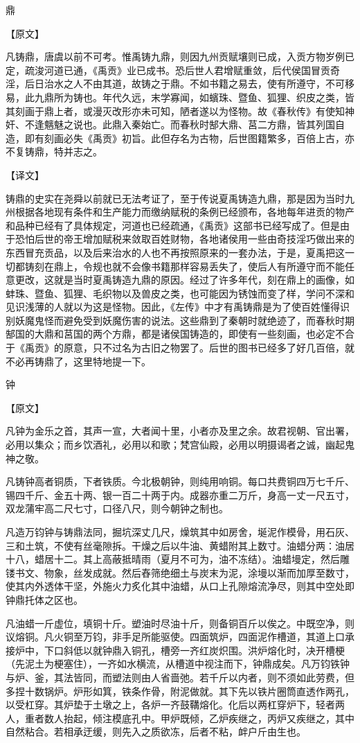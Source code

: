 \documentclass[12pt,UTF8]{ctexbook}
\begin{document}
鼎

【原文】

凡铸鼎，唐虞以前不可考。惟禹铸九鼎，则因九州贡赋壤则已成，入贡方物岁例已定，疏浚河道已通，《禹贡》业已成书。恐后世人君增赋重敛，后代侯国冒贡奇淫，后日治水之人不由其道，故铸之于鼎。不如书籍之易去，使有所遵守，不可移易，此九鼎所为铸也。年代久远，末学寡闻，如蠙珠、暨鱼、狐狸、织皮之类，皆其刻画于鼎上者，或漫灭改形亦未可知，陋者遂以为怪物。故《春秋传》有使知神奸、不逢魑魅之说也。此鼎入秦始亡。而春秋时郜大鼎、莒二方鼎，皆其列国自造，即有刻画必失《禹贡》初旨。此但存名为古物，后世图籍繁多，百倍上古，亦不复铸鼎，特并志之。

【译文】

铸鼎的史实在尧舜以前就已无法考证了，至于传说夏禹铸造九鼎，那是因为当时九州根据各地现有条件和生产能力而缴纳赋税的条例已经颁布，各地每年进贡的物产和品种已经有了具体规定，河道也已经疏通，《禹贡》这部书已经写成了。但是由于恐怕后世的帝王增加赋税来敛取百姓财物，各地诸侯用一些由奇技淫巧做出来的东西冒充贡品，以及后来治水的人也不再按照原来的一套办法，于是，夏禹把这一切都铸刻在鼎上，令规也就不会像书籍那样容易丢失了，使后人有所遵守而不能任意更改，这就是当时夏禹铸造九鼎的原因。经过了许多年代，刻在鼎上的画像，如蚌珠、暨鱼、狐狸、毛织物以及兽皮之类，也可能因为锈蚀而变了样，学问不深和见识浅薄的人就以为这是怪物。因此，《左传》中才有禹铸鼎是为了使百姓懂得识别妖魔鬼怪而避免受到妖魔伤害的说法。这些鼎到了秦朝时就绝迹了，而春秋时期郜国的大鼎和莒国的两个方鼎，都是诸侯国铸造的，即使有一些刻画，也必定不合于《禹贡》的原意，只不过名为古旧之物罢了。后世的图书已经多了好几百倍，就不必再铸鼎了，这里特地提一下。

钟

【原文】

凡钟为金乐之首，其声一宣，大者闻十里，小者亦及里之余。故君视朝、官出署，必用以集众；而乡饮酒礼，必用以和歌；梵宫仙殿，必用以明摄谒者之诚，幽起鬼神之敬。

凡铸钟高者铜质，下者铁质。今北极朝钟，则纯用响铜。每口共费铜四万七千斤、锡四千斤、金五十两、银一百二十两于内。成器亦重二万斤，身高一丈一尺五寸，双龙蒲牢高二尺七寸，口径八尺，则今朝钟之制也。

凡造万钧钟与铸鼎法同，掘坑深丈几尺，燥筑其中如房舍，埏泥作模骨，用石灰、三和土筑，不使有丝毫隙拆。干燥之后以牛油、黄蜡附其上数寸。油蜡分两：油居十八，蜡居十二。其上高蔽抵晴雨（夏月不可为，油不冻结）。油蜡墁定，然后雕镂书文、物象，丝发成就。然后舂筛绝细土与炭末为泥，涂墁以渐而加厚至数寸，使其内外透体干坚，外施火力炙化其中油蜡，从口上孔隙熔流净尽，则其中空处即钟鼎托体之区也。

凡油蜡一斤虚位，填铜十斤。塑油时尽油十斤，则备铜百斤以俟之。中既空净，则议熔铜。凡火铜至万钧，非手足所能驱使。四面筑炉，四面泥作槽道，其道上口承接炉中，下口斜低以就钟鼎入铜孔，槽旁一齐红炭炽围。洪炉熔化时，决开槽梗（先泥土为梗塞住），一齐如水横流，从槽道中视注而下，钟鼎成矣。凡万钧铁钟与炉、釜，其法皆同，而塑法则由人省啬弛。若千斤以内者，则不须如此劳费，但多捏十数锅炉。炉形如箕，铁条作骨，附泥做就。其下先以铁片圈筒直透作两孔，以受杠穿。其炉垫于土墩之上，各炉一齐鼓鞲熔化。化后以两杠穿炉下，轻者两人，重者数人抬起，倾注模底孔中。甲炉既倾，乙炉疾继之，丙炉又疾继之，其中自然粘合。若相承迂缓，则先入之质欲冻，后者不粘，衅户斤由生也。
\end{document}
